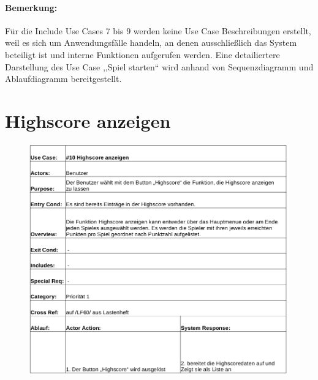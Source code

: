 \paragraph{Bemerkung: }Für die Include Use Cases 7 bis 9 werden keine Use Case Beschreibungen erstellt, weil es sich um Anwendungsfälle handeln, an denen ausschließlich das System beteiligt ist und interne Funktionen aufgerufen werden. Eine detailiertere Darstellung des Use Case ,,Spiel starten`` wird anhand von Sequenzdiagramm und Ablaufdiagramm bereitgestellt.

\clearpage
\section{Highscore anzeigen}
\begin{figure}[!h]
	\centering
    \includegraphics[width=\textwidth]{./ucbHighscore.png}
	\label{}
\end{figure}
